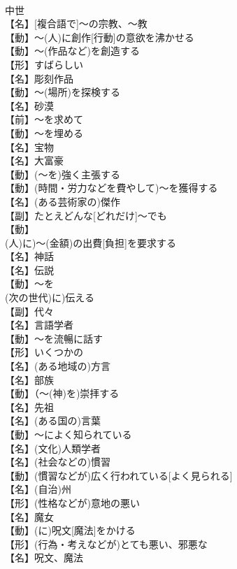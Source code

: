 \documentclass[8pt]{extreport}
\begin{document}
\begin{CJK}{UTF8}{min}
\\	中世
\\	【名】[複合語で]～の宗教、～教
\\	【動】～(人)に創作[行動]の意欲を沸かせる
\\	【動】～(作品など)を創造する
\\	【形】すばらしい
\\	【名】彫刻作品
\\	【動】～(場所)を探検する
\\	【名】砂漠
\\	【前】～を求めて
\\	【動】～を埋める
\\	【名】宝物
\\	【名】大富豪
\\	【動】(～を)強く主張する
\\	【動】(時間・労力などを費やして)～を獲得する
\\	【名】(ある芸術家の)傑作
\\	【副】たとえどんな[どれだけ]～でも
\\	【動】
\\	(人)に)～(金額)の出費[負担]を要求する
\\	【名】神話
\\	【名】伝説
\\	【動】～を
\\	(次の世代)に)伝える
\\	【副】代々
\\	【名】言語学者
\\	【動】～を流暢に話す
\\	【形】いくつかの
\\	【名】(ある地域の)方言
\\	【名】部族
\\	【動】（～(神)を)崇拝する
\\	【名】先祖
\\	【名】(ある国の)言葉
\\	【動】～によく知られている
\\	【名】(文化)人類学者
\\	【名】(社会などの)慣習
\\	【動】(慣習などが)広く行われている[よく見られる]
\\	【名】(自治)州
\\	【形】(性格などが)意地の悪い
\\	【名】魔女
\\	【動】(に)呪文[魔法]をかける
\\	【形】(行為・考えなどが)とても悪い、邪悪な
\\	【名】呪文、魔法

\end{CJK}
\end{document}
